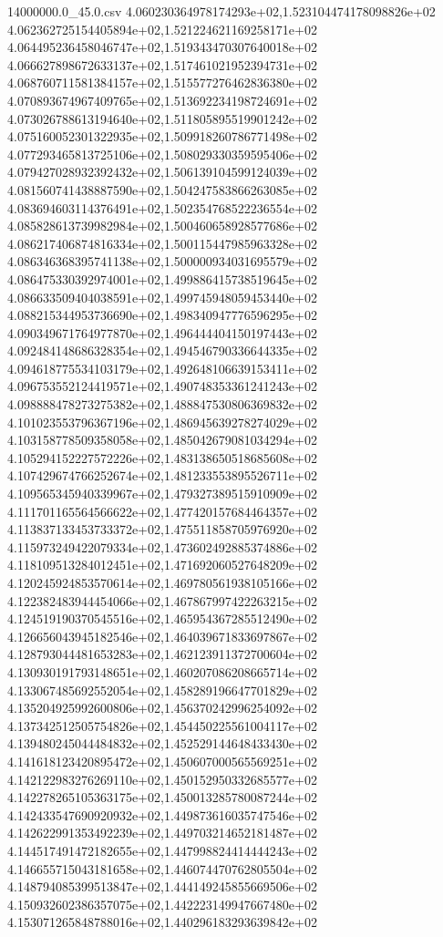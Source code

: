 \begin{filecontents*}{14000000.0_45.0.csv}
4.060230364978174293e+02,1.523104474178098826e+02
4.062362725154405894e+02,1.521224621169258171e+02
4.064495236458046747e+02,1.519343470307640018e+02
4.066627898672633137e+02,1.517461021952394731e+02
4.068760711581384157e+02,1.515577276462836380e+02
4.070893674967409765e+02,1.513692234198724691e+02
4.073026788613194640e+02,1.511805895519901242e+02
4.075160052301322935e+02,1.509918260786771498e+02
4.077293465813725106e+02,1.508029330359595406e+02
4.079427028932392432e+02,1.506139104599124039e+02
4.081560741438887590e+02,1.504247583866263085e+02
4.083694603114376491e+02,1.502354768522236554e+02
4.085828613739982984e+02,1.500460658928577686e+02
4.086217406874816334e+02,1.500115447985963328e+02
4.086346368395741138e+02,1.500000934031695579e+02
4.086475330392974001e+02,1.499886415738519645e+02
4.086633509404038591e+02,1.499745948059453440e+02
4.088215344953736690e+02,1.498340947776596295e+02
4.090349671764977870e+02,1.496444404150197443e+02
4.092484148686328354e+02,1.494546790336644335e+02
4.094618775534103179e+02,1.492648106639153411e+02
4.096753552124419571e+02,1.490748353361241243e+02
4.098888478273275382e+02,1.488847530806369832e+02
4.101023553796367196e+02,1.486945639278274029e+02
4.103158778509358058e+02,1.485042679081034294e+02
4.105294152227572226e+02,1.483138650518685608e+02
4.107429674766252674e+02,1.481233553895526711e+02
4.109565345940339967e+02,1.479327389515910909e+02
4.111701165564566622e+02,1.477420157684464357e+02
4.113837133453733372e+02,1.475511858705976920e+02
4.115973249422079334e+02,1.473602492885374886e+02
4.118109513284012451e+02,1.471692060527648209e+02
4.120245924853570614e+02,1.469780561938105166e+02
4.122382483944454066e+02,1.467867997422263215e+02
4.124519190370545516e+02,1.465954367285512490e+02
4.126656043945182546e+02,1.464039671833697867e+02
4.128793044481653283e+02,1.462123911372700604e+02
4.130930191793148651e+02,1.460207086208665714e+02
4.133067485692552054e+02,1.458289196647701829e+02
4.135204925992600806e+02,1.456370242996254092e+02
4.137342512505754826e+02,1.454450225561004117e+02
4.139480245044484832e+02,1.452529144648433430e+02
4.141618123420895472e+02,1.450607000565569251e+02
4.142122983276269110e+02,1.450152950332685577e+02
4.142278265105363175e+02,1.450013285780087244e+02
4.142433547690920932e+02,1.449873616035747546e+02
4.142622991353492239e+02,1.449703214652181487e+02
4.144517491472182655e+02,1.447998824414444243e+02
4.146655715043181658e+02,1.446074470762805504e+02
4.148794085399513847e+02,1.444149245855669506e+02
4.150932602386357075e+02,1.442223149947667480e+02
4.153071265848788016e+02,1.440296183293639842e+02

\end{filecontents*}
